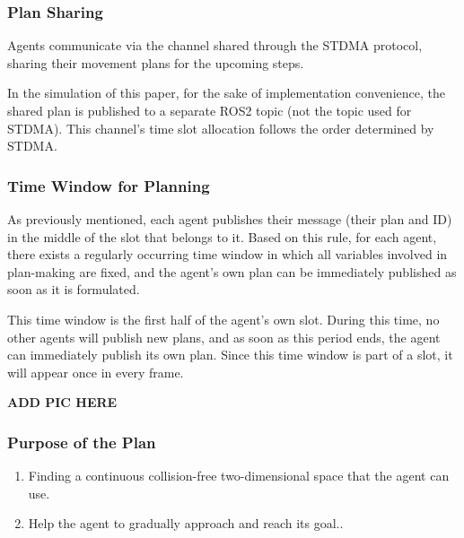 \subsubsection{Plan Sharing}

Agents communicate via the channel shared through the STDMA protocol, sharing their movement plans for the upcoming steps.

In the simulation of this paper, for the sake of implementation convenience, the shared plan is published to a separate ROS2 topic (not the topic used for STDMA). This channel's time slot allocation follows the order determined by STDMA.


\subsubsection{Time Window for Planning}

As previously mentioned, each agent publishes their message (their plan and ID) in the middle of the slot that belongs to it.
Based on this rule, for each agent, there exists a regularly occurring time window 
in which all variables involved in plan-making are fixed, and the agent's own plan can be immediately published as soon as it is formulated.

This time window is the first half of the agent's own slot. During this time, no other agents will publish new plans, and as soon as this period ends, the agent can immediately publish its own plan.
Since this time window is part of a slot, it will appear once in every frame.

\textbf{ADD PIC HERE}%

\subsubsection{Purpose of the Plan}
\begin{enumerate}
    \item Finding a continuous collision-free two-dimensional space that the agent can use.
    \item Help the agent to gradually approach and reach its goal..
\end{enumerate}

